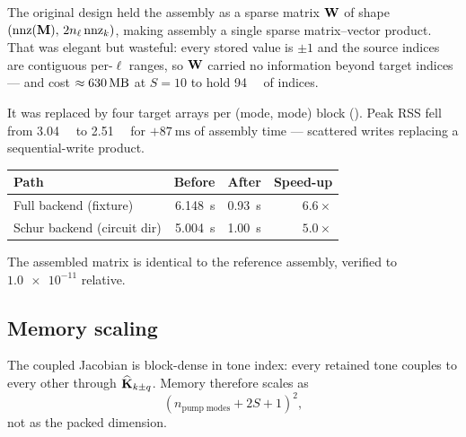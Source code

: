 \begin{implnote}
The original design held the assembly as a sparse matrix $\mathbf{W}$ of shape
$(\operatorname{nnz}(\mathbf{M}),\,2 n_\ell \operatorname{nnz}_k)$, making assembly a single sparse
matrix--vector product. That was elegant but wasteful: every stored value is
$\pm1$ and the source indices are contiguous per-$\ell$ ranges, so $\mathbf{W}$
carried no information beyond target indices --- and cost
$\approx\SI{630}{\mega\byte}$ at $S=10$ to hold \SI{94}{\mega\byte} of indices.

It was replaced by four  target arrays per (mode, mode) block
(). Peak RSS fell from \SI{3.04}{\giga\byte} to
\SI{2.51}{\giga\byte} for $+\SI{87}{\milli\second}$ of assembly time ---
scattered writes replacing a sequential-write product.
\end{implnote}

\begin{measured}
\begin{center}
\begin{tabular}{@{}l r r r@{}}
\toprule
Path & Before & After & Speed-up \\
\midrule
Full backend (fixture) & \SI{6.148}{\second} & \SI{0.93}{\second} & $6.6\times$ \\
Schur backend (circuit dir) & \SI{5.004}{\second} & \SI{1.00}{\second} & $5.0\times$ \\
\bottomrule
\end{tabular}
\end{center}
The assembled matrix is identical to the reference assembly, verified to
$\num{1.0e-11}$ relative.
\end{measured}

\subsection{Memory scaling}

\begin{proposition}
The coupled Jacobian is block-dense in tone index: every retained tone couples
to every other through $\widehat{\mathbf{K}}_{k\pm q}$. Memory therefore scales as
\begin{equation}
  \left(n_{\mathrm{pump\;modes}} + 2S + 1\right)^{2},
\end{equation}
not as the packed dimension.
\end{proposition}

